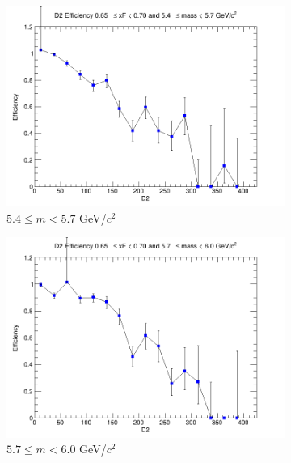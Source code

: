 \documentclass[11pt]{article}
\begin{document}
\begin{figure}[p]
\begin{subfigure}[b]{0.32\textwidth}
        \includegraphics[width=\textwidth]{./kTrackerEfficiencyPlots/D2_Efficiency_xF13_mass4.png}
        \caption{$5.4 \leq m < 5.7$ GeV/$c^2$}
    \end{subfigure}\hfill
    \begin{subfigure}[b]{0.32\textwidth}
        \centering
        \includegraphics[width=\textwidth]{./kTrackerEfficiencyPlots/D2_Efficiency_xF13_mass5.png}
        \caption{$5.7 \leq m < 6.0$ GeV/$c^2$}
    \end{subfigure}\vspace{0.5cm}
    \begin{subfigure}[b]{0.32\textwidth}
        \centering

\end{subfigure}
\end{figure}
\end{document}
